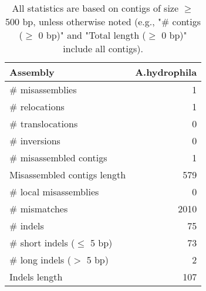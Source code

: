 \documentclass[12pt,a4paper]{article}
\begin{document}
\begin{table}[ht]
\begin{center}
\caption{All statistics are based on contigs of size $\geq$ 500 bp, unless otherwise noted (e.g., "\# contigs ($\geq$ 0 bp)" and "Total length ($\geq$ 0 bp)" include all contigs).}
\begin{tabular}{|l*{1}{|r}|}
\hline
Assembly & A.hydrophila \\ \hline
\# misassemblies & 1 \\ \hline
\hspace{5mm}\# relocations & 1 \\ \hline
\hspace{5mm}\# translocations & 0 \\ \hline
\hspace{5mm}\# inversions & 0 \\ \hline
\# misassembled contigs & 1 \\ \hline
Misassembled contigs length & 579 \\ \hline
\# local misassemblies & 0 \\ \hline
\# mismatches & 2010 \\ \hline
\# indels & 75 \\ \hline
\hspace{5mm}\# short indels ($\leq$ 5 bp) & 73 \\ \hline
\hspace{5mm}\# long indels ($>$ 5 bp) & 2 \\ \hline
Indels length & 107 \\ \hline
\end{tabular}
\end{center}
\end{table}
\end{document}
